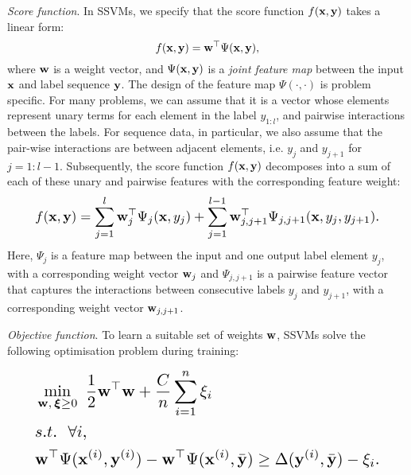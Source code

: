 \emph{Score function}. In SSVMs, we specify that the score function $f(\mathbf{x}, \mathbf{y})$ takes a linear form:
\begin{equation*}
f(\mathbf{x}, \mathbf{y}) = \mathbf{w}^\top \Psi(\mathbf{x}, \mathbf{y}),
\end{equation*}
where $\mathbf{w}$ is a weight vector, and $\Psi(\mathbf{x}, \mathbf{y})$ is a \emph{joint feature map}
between the input $\mathbf{x}$ and label sequence $\mathbf{y}$.
The design of the feature map $\Psi(\cdot,\cdot)$ is problem specific.
For many problems, we can assume that it is a vector whose elements represent unary
 terms for each element in the label $y_{1:l}$, and pairwise interactions between the labels.
 For sequence data, in particular, we also assume that the pair-wise interactions are between
 adjacent elements, i.e. $y_j$ and $y_{j+1}$ for $j=1:l-1$.
 Subsequently, the score function $f(\mathbf{x},\mathbf{y})$ decomposes into a sum of
 each of these unary and pairwise features with the corresponding feature weight:
\begin{equation}
\label{eq:jointfeature}
\resizebox{0.9\linewidth}{!}{$\displaystyle
f(\x, \y) =  %
\sum_{j=1}^l \w_j^\top \Psi_j(\x, y_j)
  + \sum_{j=1}^{l-1} \w_{j,j+1}^\top \Psi_{j,j+1}(\x, y_{j}, y_{j+1}). %
  $}
\end{equation}
Here, $\Psi_j$ is a feature map between the input and one output label element $y_j$, with a corresponding weight vector $\mathbf{w}_j$
and $\Psi_{j,j+1}$ is a pairwise feature vector that captures the interactions between consecutive labels $y_j$ and $y_{j+1}$,
with a corresponding weight vector $\mathbf{w}_{j,j+1}$.

\emph{Objective function}.
To learn a suitable set of weights $\mathbf{w}$, SSVMs solve the following optimisation problem during training:

\begin{equation}
\label{eq:nslack}
\resizebox{0.9\linewidth}{!}{$\displaystyle
\begin{aligned}
&\min_{\w, \, \bm{\xi} \ge 0} ~\frac{1}{2} \w^\top \w + \frac{C}{n} \sum_{i=1}^n \xi_i \\
&s.t.~~  \forall i, \\
& \w^\top \Psi(\x^{(i)}, \y^{(i)}) - \w^\top \Psi(\x^{(i)}, \bar{\y}) \ge
  \Delta(\y^{(i)}, \bar{\y}) - \xi_i.
\end{aligned}
$}
\end{equation}

